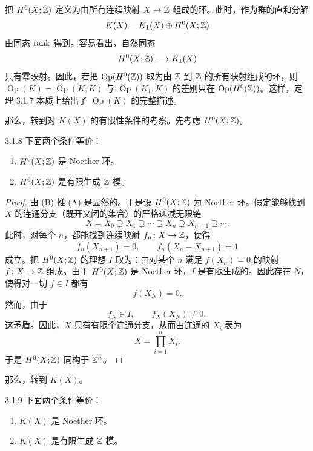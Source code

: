 把 $H^0(X;\mathbb{Z})$ 定义为由所有连续映射 $X\to\mathbb{Z}$ 组成的环。此时，作为群的直和分解
\[
K(X)=K_1(X)\oplus H^0(X;\mathbb{Z})
\]
由同态 $\operatorname{rank}$ 得到。容易看出，自然同态
\[
H^0(X;\mathbb{Z})\longrightarrow K_1(X)
\]
只有零映射。因此，若把 $\operatorname{Op}(H^0(\mathbb{Z}))$ 取为由 $\mathbb{Z}$ 到 $\mathbb{Z}$ 的所有映射组成的环，则 $\operatorname{Op}(K)=\operatorname{Op}(K,K)$ 与 $\operatorname{Op}(K_1,K)$ 的差别只在 $\operatorname{Op}(H^0(\mathbb{Z}))$。这样，定理 3.1.7 本质上给出了 $\operatorname{Op}(K)$ 的完整描述。

那么，转到对 $K(X)$ 的有限性条件的考察。先考虑 $H^0(X;\mathbb{Z})$。

\begin{proposition*}{3.1.8}
下面两个条件等价：
\begin{enumerate}[label=(\Alph*),leftmargin=2.2em,itemsep=2pt]
\item $H^0(X;\mathbb{Z})$ 是 Noether 环。
\item $H^0(X;\mathbb{Z})$ 是有限生成 $\mathbb{Z}$ 模。
\end{enumerate}
\end{proposition*}

\begin{proof}
由 (B) 推 (A) 是显然的。于是设 $H^0(X;\mathbb{Z})$ 为 Noether 环。假定能够找到 $X$ 的连通分支（既开又闭的集合）的严格递减无限链
\[
X=X_0\supsetneq X_1\supsetneq\cdots\supsetneq X_n\supsetneq X_{n+1}\supsetneq\cdots.
\]
此时，对每个 $n$，都能找到连续映射 $f_n\colon X\to\mathbb{Z}$，使得
\[
f_n(X_{n+1})=0,\qquad f_n(X_n-X_{n+1})=1
\]
成立。把 $H^0(X;\mathbb{Z})$ 的理想 $I$ 取为：由对某个 $n$ 满足 $f(X_n)=0$ 的映射 $f\colon X\to\mathbb{Z}$ 组成。由于 $H^0(X;\mathbb{Z})$ 是 Noether 环，$I$ 是有限生成的。因此存在 $N$，使得对一切 $f\in I$ 都有
\[
f(X_N)=0.
\]
然而，由于
\[
f_N\in I,\qquad f_N(X_N)\ne 0,
\]
这矛盾。因此，$X$ 只有有限个连通分支，从而由连通的 $X_i$ 表为
\[
X=\prod_{i=1}^{n}X_i.
\]
于是 $H^0(X;\mathbb{Z})$ 同构于 $\mathbb{Z}^n$。
\end{proof}


那么，转到 $K(X)$。

\begin{proposition*}{3.1.9}
下面两个条件等价：
\begin{enumerate}[label=(\Alph*),leftmargin=2.2em,itemsep=2pt]
\item $K(X)$ 是 Noether 环。
\item $K(X)$ 是有限生成 $\mathbb{Z}$ 模。
\end{enumerate}
\end{proposition*}

